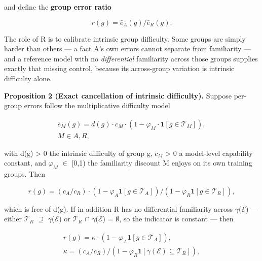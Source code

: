 and define the \textbf{group error ratio}

\begin{equation}
\label{eq:43}
r(g) = \bar{e}_A(g) / \bar{e}_R(g).
\end{equation}

The role of R is to calibrate intrinsic group difficulty. Some groups are simply harder than others --- a fact A's own errors cannot separate from familiarity --- and a reference model with no \emph{differential} familiarity across those groups supplies exactly that missing control, because its across-group variation is intrinsic difficulty alone.

\textbf{Proposition 2 (Exact cancellation of intrinsic difficulty).} Suppose per-group errors follow the multiplicative difficulty model

\begin{equation}
\label{eq:44}
\begin{aligned}
\bar{e}_M(g) = d(g) \cdot c_M \cdot ( 1 - \varphi _M \cdot \mathbf{1}[ g \in \mathcal{T}_M ] ) , \\
M \in {A, R},
\end{aligned}
\end{equation}

with d(g) > 0 the intrinsic difficulty of group g, $c_{M}$ > 0 a model-level capability constant, and $\varphi_{M}$ $\in$ [0,1) the familiarity discount M enjoys on its own training groups. Then

\begin{equation}
\label{eq:45}
r(g) = ( c_A / c_R ) \cdot ( 1 - \varphi _A \mathbf{1}[ g \in \mathcal{T}_A ] ) / ( 1 - \varphi _R \mathbf{1}[ g \in \mathcal{T}_R ] ),
\end{equation}

which is free of d(g). If in addition R has no differential familiarity across $\gamma$($\mathcal{E}$) --- either $\mathcal{T}_{R}$ $\supseteq$ $\gamma$($\mathcal{E}$) or $\mathcal{T}_{R}$ $\cap$ $\gamma$($\mathcal{E}$) = $\emptyset$, so the indicator is constant --- then

\begin{equation}
\label{eq:46}
\begin{aligned}
r(g) = \kappa \cdot ( 1 - \varphi _A \mathbf{1}[ g \in \mathcal{T}_A ] ), \\
\kappa = ( c_A / c_R ) / ( 1 - \varphi _R \mathbf{1}[\gamma (\mathcal{E}) \subseteq \mathcal{T}_R] ) ,
\end{aligned}
\end{equation}

